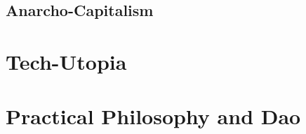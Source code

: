 \documentclass[10pt,titlepage]{article}
\begin{document}
\subsection{Anarcho-Capitalism}


\section{Tech-Utopia}


\section{Practical Philosophy and Dao}




%
%






\end{document}
